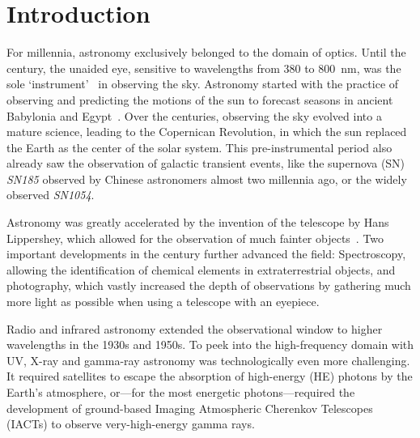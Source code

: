 \chapter*{Introduction}\label{introduction}

For millennia, astronomy exclusively belonged to the domain of optics. Until the  century, the unaided eye, sensitive to wavelengths from \num{380} to \SI{800}{\nano\m}, was the sole `instrument'~ in observing the sky. Astronomy started with the practice of observing and predicting the motions of the sun to forecast seasons in ancient Babylonia and Egypt~. Over the centuries, observing the sky evolved into a mature science, leading to the Copernican Revolution, in which the sun replaced the Earth as the center of the solar system. This pre-instrumental period also already saw the observation of galactic transient events, like the supernova (SN) \emph{SN185} observed by Chinese astronomers almost two millennia ago, or the widely observed \emph{SN1054}.

Astronomy was greatly accelerated by the invention of the telescope by Hans Lippershey, which allowed for the observation of much fainter objects~. Two important developments in the  century further advanced the field: Spectroscopy, allowing the identification of chemical elements in extraterrestrial objects, and photography, which vastly increased the depth of observations by gathering much more light as possible when using a telescope with an eyepiece.

Radio and infrared astronomy extended the observational window to higher wavelengths in the 1930s and 1950s. To peek into the high-frequency domain with UV, X-ray and gamma-ray astronomy was technologically even more challenging. It required satellites to escape the absorption of high-energy (HE) photons by the Earth's atmosphere, or---for the most energetic photons---required the development of ground-based Imaging Atmospheric Cherenkov Telescopes (IACTs) to observe very-high-energy gamma rays.

